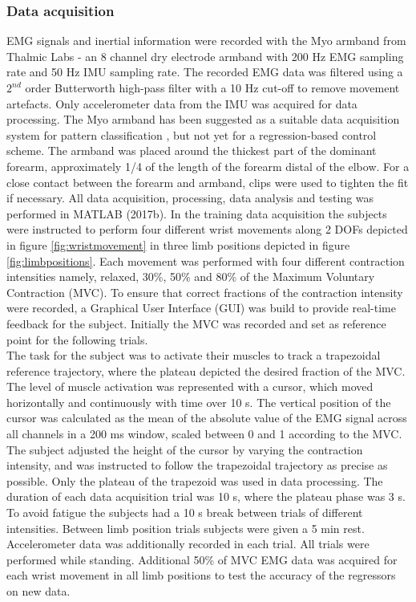 \begin{multicols}{2}
\subsubsection*{Data acquisition}
EMG signals and inertial information were recorded with the Myo armband from Thalmic Labs - an 8 channel dry electrode armband with 200 Hz EMG sampling rate and 50 Hz IMU sampling rate. The recorded EMG data was filtered using a $2^{nd}$ order Butterworth high-pass filter with a 10 Hz cut-off to remove movement artefacts. Only accelerometer data from the IMU was acquired for data processing. The Myo armband has been suggested as a suitable data acquisition system for pattern classification \cite{Mendez2017}, but not yet for a regression-based control scheme. 
The armband was placed around the thickest part of the dominant forearm, approximately 1/4 of the length of the forearm distal of the elbow. For a close contact between the forearm and armband, clips were used to tighten the fit if necessary. All data acquisition, processing, data analysis and testing was performed in MATLAB (2017b).
In the training data acquisition the subjects were instructed to perform four different wrist movements along 2 DOFs depicted in figure \ref{fig:wristmovement} in three limb positions depicted in figure \ref{fig:limbpositions}. Each movement was performed with four different contraction intensities namely, relaxed, 30\%, 50\% and 80\% of the Maximum Voluntary Contraction (MVC). To ensure that correct fractions of the contraction intensity were recorded, a Graphical User Interface (GUI) was build to provide real-time feedback for the subject. Initially the MVC was recorded and set as reference point for the following trials. \\
The task for the subject was to activate their muscles to track a trapezoidal reference trajectory, where the plateau depicted the desired fraction of the MVC. The level of muscle activation was represented with a cursor, which moved horizontally and continuously with time over 10 s. The vertical position of the cursor was calculated as the mean of the absolute value of the EMG signal across all channels in a 200 ms window, scaled between 0 and 1 according to the MVC. The subject adjusted the height of the cursor by varying the contraction intensity, and was instructed to follow the trapezoidal trajectory as precise as possible. Only the plateau of the trapezoid was used in data processing. The duration of each data acquisition trial was 10 s, where the plateau phase was 3 s. To avoid fatigue the subjects had a 10 s break between trials of different intensities. Between limb position trials subjects were given a 5 min rest. Accelerometer data was additionally recorded in each trial. All trials were performed while standing.
Additional 50\% of MVC EMG data was acquired for each wrist movement in all limb positions to test the accuracy of the regressors on new data. 


\end{multicols}
